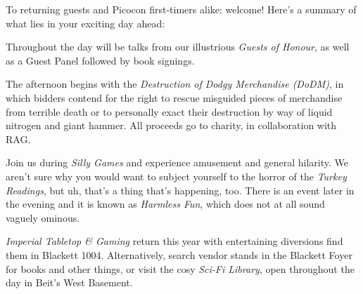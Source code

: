 To returning guests and Picocon first-timers alike: welcome! Here's a
summary of what lies in your exciting day ahead:

Throughout the day will be talks from our illustrious \emph{Guests of
Honour}, as well as a Guest Panel followed by book signings.

The afternoon begins with the \emph{Destruction of Dodgy Merchandise
(DoDM)}, in which bidders contend for the right to rescue misguided
pieces of merchandise from terrible death \textemdash{} or to
personally exact their destruction by way of liquid nitrogen and
giant hammer. All proceeds go to charity, in collaboration with RAG.

Join us during \emph{Silly Games} and experience amusement and general
 hilarity. We aren't sure why you would want to subject yourself to
 the horror of the \emph{Turkey Readings}, but uh, that's a thing
 that's happening, too. There is an event later in the evening and it
 is known as \emph{Harmless Fun}, which does not at all sound vaguely
 ominous.

\emph{Imperial Tabletop \& Gaming} return this year with entertaining
diversions \textemdash{} find them in Blackett 1004. Alternatively,
search vendor stands in the Blackett Foyer for books and other things,
or visit the cosy \emph{Sci-Fi Library}, open throughout the day in
Beit's West Basement.
